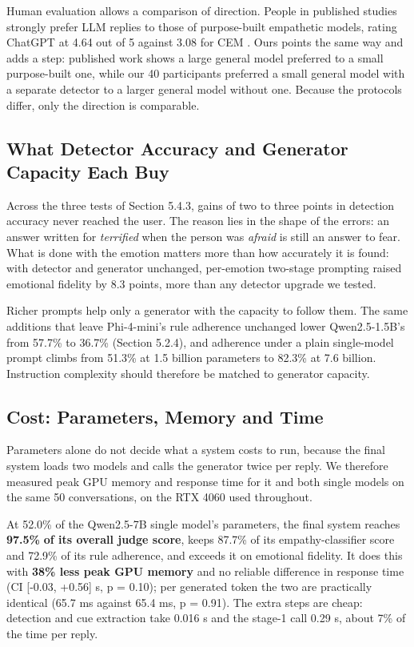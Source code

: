 Human evaluation allows a comparison of direction. People in published studies strongly prefer LLM replies to those of purpose-built empathetic models, rating ChatGPT at 4.64 out of 5 against 3.08 for CEM \cite{qian2023llm}. Ours points the same way and adds a step: published work shows a large general model preferred to a small purpose-built one, while our 40 participants preferred a small general model with a separate detector to a larger general model without one. Because the protocols differ, only the direction is comparable.

\subsection{What Detector Accuracy and Generator Capacity Each Buy}
\label{sec:5.5.2}

Across the three tests of Section 5.4.3, gains of two to three points in detection accuracy never reached the user. The reason lies in the shape of the errors: an answer written for\textit{ terrified} when the person was \textit{afraid }is still an answer to fear. What is done with the emotion matters more than how accurately it is found: with detector and generator unchanged, per-emotion two-stage prompting raised emotional fidelity by 8.3 points, more than any detector upgrade we tested.

Richer prompts help only a generator with the capacity to follow them. The same additions that leave Phi-4-mini's rule adherence unchanged lower Qwen2.5-1.5B's from 57.7\% to 36.7\% (Section 5.2.4), and adherence under a plain single-model prompt climbs from 51.3\% at 1.5 billion parameters to 82.3\% at 7.6 billion. Instruction complexity should therefore be matched to generator capacity.

\subsection{Cost: Parameters, Memory and Time}
\label{sec:5.5.3}

Parameters alone do not decide what a system costs to run, because the final system loads two models and calls the generator twice per reply. We therefore measured peak GPU memory and response time for it and both single models on the same 50 conversations, on the RTX 4060 used throughout.

At 52.0\% of the Qwen2.5-7B single model's parameters, the final system reaches \textbf{97.5\%} \textbf{of its overall judge score}, keeps 87.7\% of its empathy-classifier score and 72.9\% of its rule adherence, and exceeds it on emotional fidelity. It does this with \textbf{38\% less peak GPU memory} and no reliable difference in response time (CI [-0.03, +0.56] s, p = 0.10); per generated token the two are practically identical (65.7 ms against 65.4 ms, p = 0.91). The extra steps are cheap: detection and cue extraction take 0.016 s and the stage-1 call 0.29 s, about 7\% of the time per reply.

